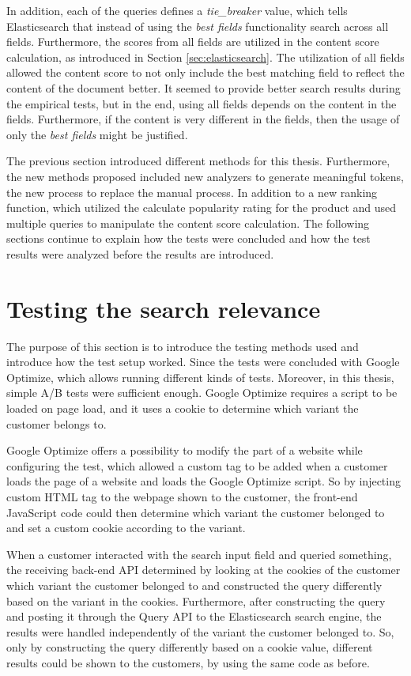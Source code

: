 In addition, each of the queries defines a \emph{tie\_breaker} value, which tells Elasticsearch 
that instead of using the \emph{best fields} functionality search across all fields.
Furthermore, the scores from all fields are utilized in the content score calculation, as introduced 
in Section \ref{sec:elasticsearch}.
The utilization of all fields allowed the content score to not only include the best matching field to
reflect the content of the document better.
It seemed to provide better search results during the empirical tests, but in the end, using all
fields depends on the content in the fields.
Furthermore, if the content is very different in the fields, then the usage of only the \emph{best fields}
might be justified.


The previous section introduced different methods for this thesis.
Furthermore, the new methods proposed included new analyzers to generate meaningful tokens, 
the new process to replace the manual process.
In addition to a new ranking function, which utilized the calculate popularity rating for the product
and used multiple queries to manipulate the content score calculation.
The following sections continue to explain how the tests were concluded and how the test results 
were analyzed before the results are introduced.


\section{Testing the search relevance}
\label{sec:methodTests}

The purpose of this section is to introduce the testing methods used and introduce how the test setup worked.
Since the tests were concluded with Google Optimize, which allows running different kinds of tests.
Moreover, in this thesis, simple A/B tests were sufficient enough. 
Google Optimize requires a script to be loaded on page load, and it uses a cookie to determine 
which variant the customer belongs to.

Google Optimize offers a possibility to modify the part of a website while configuring the test, 
which allowed a custom tag to be added when a customer loads the page 
of a website and loads the Google Optimize script.
So by injecting custom HTML tag to the webpage shown to the customer, the front-end JavaScript code could then
determine which variant the customer belonged to and set a custom cookie according to the variant.

When a customer interacted with the search input field and queried something, the receiving back-end
API determined by looking at the cookies of the customer which variant the customer belonged to and constructed the query differently
based on the variant in the cookies.
Furthermore, after constructing the query and posting it through the Query API to the Elasticsearch search engine, 
the results were handled independently of the variant the customer belonged to.
So, only by constructing the query differently based on a cookie value, different results could be shown 
to the customers, by using the same code as before.



